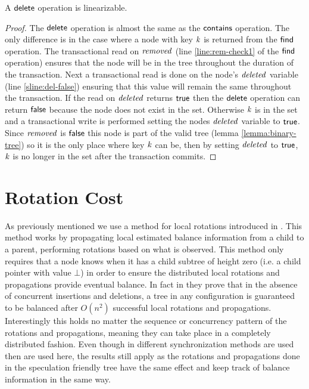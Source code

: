 \begin{theorem}
\label{theorem:delete-valid}
A $\act{delete}$ operation is linearizable.
\end{theorem}
\begin{proof}
The $\act{delete}$ operation is almost the same as the $\act{contains}$ operation.
The only difference is in the case where a node with key $\ms{k}$ is returned from the $\act{find}$ operation.
The transactional read on $\ms{removed}$ (line \ref{line:rem-check1} of the $\act{find}$ operation) ensures that the node will be in the tree throughout the duration of the transaction.
Next a transactional read is done on the node's $\ms{deleted}$ variable (line \ref{sline:del-false}) ensuring that this value will remain the same throughout the transaction.
If the read on $\ms{deleted}$ returns $\lit{true}$ then the $\act{delete}$ operation can return $\lit{false}$ because the node does not exist in the set.
Otherwise $\ms{k}$ is in the set and a transactional write is performed setting the nodes $\ms{deleted}$ variable to $\lit{true}$.
Since $\ms{removed}$ is $\lit{false}$ this node is part of the valid tree (lemma \ref{lemma:binary-tree}) so it is the only place where key $\ms{k}$ can be, then by setting
$\ms{deleted}$ to $\lit{true}$, $\ms{k}$ is no longer in the set after the transaction commits.
\end{proof}






\section{Rotation Cost}



As previously mentioned we use a method for local rotations introduced in \cite{IRISAppr}.
This method works by propagating local estimated balance information from a child to a parent,
performing rotations based on what is observed.
This method only requires that a node knows when it has a child subtree of height zero
(i.e. a child pointer with value $\bot$) in order to ensure
the distributed local rotations and propagations provide eventual balance.
In fact in \cite{IRISAppr} they prove that in the absence of concurrent insertions and deletions,
a tree in any configuration is guaranteed to be balanced after $O(n^2)$ successful local rotations
and propagations.
Interestingly this holds no matter the sequence or concurrency pattern of the rotations
and propagations, meaning they can take place in a completely distributed fashion.
Even though in \cite{IRISAppr} different synchronization methods are used then are used here,
the results still apply as the rotations and
propagations done in the speculation friendly tree have the same effect and keep track of
balance information in the same way.

